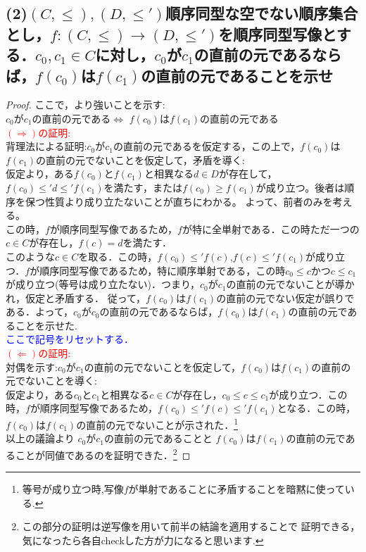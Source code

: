 \documentclass{jreport}
\begin{document}
\subsection{\normalsize{(2)$(C,\le),(D,\le ')$順序同型な空でない順序集合とし，$f:(C,\le)\to (D,\le ')$を順序同型写像とする．$c_0,c_1 \in C$に対し，$c_0$が$c_1$の直前の元であるならば，$f(c_0)$は$f(c_1)$の直前の元であることを示せ}}
\begin{proof}
	ここで，より強いことを示す:\\
	$c_0$が$c_1$の直前の元である$\Leftrightarrow$ $f(c_0)$は$f(c_1)$の直前の元である\\
	\textcolor{red}{$(\Rightarrow)$の証明:\\}
  	背理法による証明:$c_0$が$c_1$の直前の元であるを仮定する，この上で，$f(c_0)$は$f(c_1)$の直前の元でないことを仮定して，矛盾を導く:\\
	仮定より，ある$f(c_0)$と$f(c_1)$と相異なる$d \in D$が存在して，$f(c_0) \le ' d \le ' f(c_1)$を満たす，または$f(c_0)\ge f(c_1)$が成り立つ。後者は順序を保つ性質より成り立たないことが直ちにわかる。
	よって、前者のみを考える。\\
	この時，$f$が順序同型写像であるため，$f$が特に全単射である．この時ただ一つの$c \in C$が存在し，$f(c) =d$を満たす．\\
	このような$c \in C$を取る．この時，$f(c_0) \le ' f(c) $,$ f(c) \le ' f(c_1)$が成り立つ．$f$が順序同型写像であるため，特に順序単射である，この時$c_0 \le c$かつ$c \le c_1$が成り立つ(等号は成り立たない)．つまり，$c_0$が$c_1$の直前の元でないことが導かれ，仮定と矛盾する．
	従って，$f(c_0)$は$f(c_1)$の直前の元でない仮定が誤りである．よって，$c_0$が$c_0$の直前の元であるならば，$f(c_0)$は$f(c_1)$の直前の元であることを示せた.\\
	\textcolor{blue}{ここで記号をリセットする．\\}
	\textcolor{red}{$(\Leftarrow)$の証明:\\}
	対偶を示す:$c_0$が$c_1$の直前の元でないことを仮定して，$f(c_0)$は$f(c_1)$の直前の元でないことを導く:\\
	仮定より，ある$c_0$と$c_1$と相異なる$c \in C$が存在し，$c_0 \le c \le c_1$が成り立つ．この時，$f$が順序同型写像であるため，$f(c_0) \le ' f(c) \le ' f(c_1)$となる．この時，$f(c_0)$は$f(c_1)$の直前の元でないことが示された．\footnote{等号が成り立つ時,写像$f$が単射であることに矛盾することを暗黙に使っている.}\\
	以上の議論より $c_0$が$c_1$の直前の元であることと $f(c_0)$は$f(c_1)$の直前の元であることが同値であるのを証明できた．\footnote{この部分の証明は逆写像を用いて前半の結論を適用することで
	証明できる，気になったら各自checkした方が力になると思います.}
\end{proof}
\newpage
\end{document}
